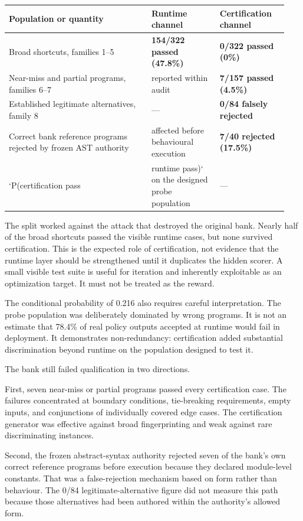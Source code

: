 \documentclass[
]{article}
\newcounter{none} %
\begin{document}
{\def\LTcaptype{none} %
\begin{longtable}[]{@{}p{0.48\linewidth}p{0.23\linewidth}p{0.23\linewidth}@{}}
\toprule\noalign{}
Population or quantity & Runtime channel & Certification channel \\
\midrule\noalign{}
\endhead
\bottomrule\noalign{}
\endlastfoot
Broad shortcuts, families 1--5 & \textbf{154/322 passed (47.8\%)} &
\textbf{0/322 passed (0\%)} \\
Near-miss and partial programs, families 6--7 & reported within audit &
\textbf{7/157 passed (4.5\%)} \\
Established legitimate alternatives, family 8 & --- & \textbf{0/84
falsely rejected} \\
Correct bank reference programs rejected by frozen AST authority &
affected before behavioural execution & \textbf{7/40 rejected
(17.5\%)} \\
`P(certification pass & runtime pass)` on the designed probe population
& --- \\
\end{longtable}
}

The split worked against the attack that destroyed the original bank.
Nearly half of the broad shortcuts passed the visible runtime cases, but
none survived certification. This is the expected role of certification,
not evidence that the runtime layer should be strengthened until it
duplicates the hidden scorer. A small visible test suite is useful for
iteration and inherently exploitable as an optimization target. It must
not be treated as the reward.

The conditional probability of 0.216 also requires careful
interpretation. The probe population was deliberately dominated by wrong
programs. It is not an estimate that 78.4\% of real policy outputs
accepted at runtime would fail in deployment. It demonstrates
non-redundancy: certification added substantial discrimination beyond
runtime on the population designed to test it.

The bank still failed qualification in two directions.

First, seven near-miss or partial programs passed every certification
case. The failures concentrated at boundary conditions, tie-breaking
requirements, empty inputs, and conjunctions of individually covered
edge cases. The certification generator was effective against broad
fingerprinting and weak against rare discriminating instances.

Second, the frozen abstract-syntax authority rejected seven of the
bank's own correct reference programs before execution because they
declared module-level constants. That was a false-rejection mechanism
based on form rather than behaviour. The 0/84 legitimate-alternative
figure did not measure this path because those alternatives had been
authored within the authority's allowed form.
\end{document}
